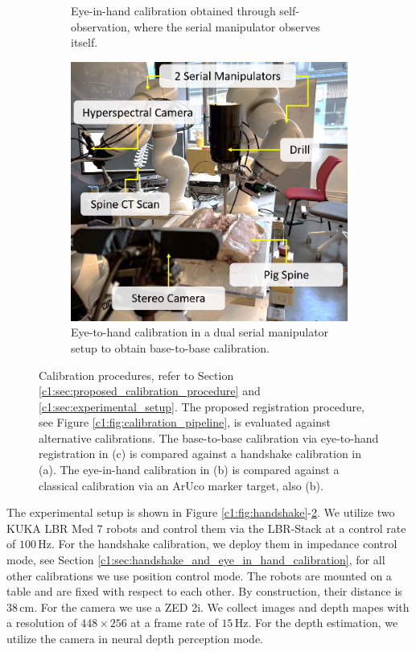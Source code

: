 \begin{figure}
\begin{subfigure}[b]{0.3\textwidth}
         \caption{Eye-in-hand calibration obtained through self-observation, where the serial manipulator observes itself.}
         \label{c1:fig:eye_in_hand}
     \end{subfigure}
     \hfill
     \begin{subfigure}[b]{0.3\textwidth}
         \centering
         \includegraphics[width=\textwidth]{fig/eye_to_hand.png}
         \caption{Eye-to-hand calibration in a dual serial manipulator setup to obtain base-to-base calibration.}
         \label{c1:fig:eye_to_hand}
     \end{subfigure}
    \caption{Calibration procedures, refer to Section \ref{c1:sec:proposed_calibration_procedure} and \ref{c1:sec:experimental_setup}. The proposed registration procedure, see Figure \ref{c1:fig:calibration_pipeline}, is evaluated against alternative calibrations. The base-to-base calibration via eye-to-hand registration in (c) is compared against a handshake calibration in (a). The eye-in-hand calibration in (b) is compared against a classical calibration via an ArUco marker target, also (b).}
    \label{c1:fig:calibrations}
\end{figure}

The experimental setup is shown in Figure \ref{c1:fig:handshake}-\ref{c1:fig:eye_to_hand}. We utilize two KUKA LBR Med 7 robots and control them via the LBR-Stack\cite{huber2023lbr} at a control rate of $100\,\text{Hz}$. For the handshake calibration, we deploy them in impedance control mode, see Section \ref{c1:sec:handshake_and_eye_in_hand_calibration}, for all other calibrations we use position control mode. The robots are mounted on a table and are fixed with respect to each other. By construction, their distance is $38\,\text{cm}$. For the camera we use a ZED 2i. We collect images and depth mapes with a resolution of $448 \times 256$ at a frame rate of $15\,\text{Hz}$. For the depth estimation, we utilize the camera in neural depth perception mode.

